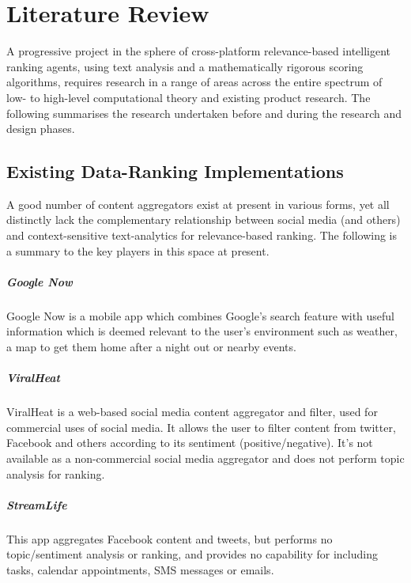 \chapter{Literature Review}

A progressive project in the sphere of cross-platform relevance-based intelligent ranking agents, using text analysis and a mathematically rigorous scoring algorithms, requires research in a range of areas across the entire spectrum of low- to high-level computational theory and existing product research. The following summarises the research undertaken before and during the research and design phases.

\section{Existing Data-Ranking Implementations}

A good number of content aggregators exist at present in various forms, yet all distinctly lack the complementary relationship between social media (and others) and context-sensitive text-analytics for relevance-based ranking. The following is a summary to the key players in this space at present.

\paragraph{Google Now}
Google Now is a mobile app which combines Google's search feature with useful information which is deemed relevant to the user's environment such as weather, a map to get them home after a night out or nearby events.

\paragraph{ViralHeat}
ViralHeat is a web-based social media content aggregator and filter, used for commercial uses of social media. It allows the user to filter content from twitter, Facebook and others according to its sentiment (positive/negative). It's not available as a non-commercial social media aggregator and does not perform topic analysis for ranking.

\paragraph{StreamLife}
This app aggregates Facebook content and tweets, but performs no topic/sentiment analysis or ranking, and provides no capability for including tasks, calendar appointments, SMS messages or emails.

